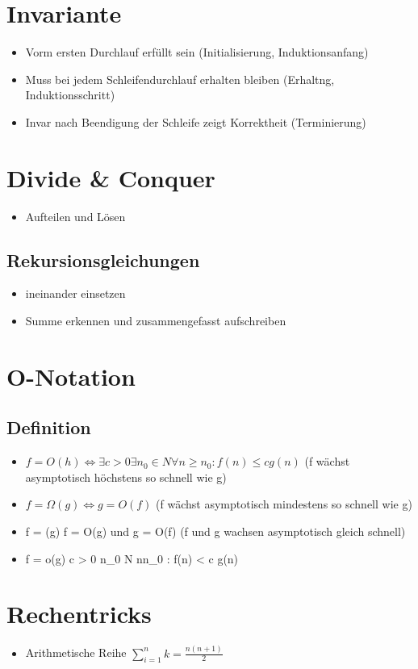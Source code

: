 \documentclass{article}
\begin{document}
\section{Invariante}
\begin{itemize}
\item Vorm ersten Durchlauf erfüllt sein (Initialisierung, Induktionsanfang)
\item Muss bei jedem Schleifendurchlauf erhalten bleiben (Erhaltng, Induktionsschritt)
\item Invar nach Beendigung der Schleife zeigt Korrektheit (Terminierung)
\end{itemize}

\section{Divide \& Conquer}
\begin{itemize}
\item Aufteilen und Lösen
\end{itemize}


\subsection{Rekursionsgleichungen}
\begin{itemize}
\item ineinander einsetzen
\item Summe erkennen und zusammengefasst aufschreiben
\end{itemize}

\section{ O-Notation}
\subsection{Definition}
\begin{itemize}
\item $f = O(h) \Leftrightarrow  \exists  c> 0 \exists n_0 \in N \forall n \geq n_0 : f(n) \leq c g(n)$ \newline (f wächst asymptotisch höchstens so schnell wie g)
\item $f = \Omega(g) \Leftrightarrow g = O(f)$ \newline (f wächst asymptotisch mindestens so schnell wie g)

\item f = \Theta(g) \Leftrightarrow f = O(g) und g = O(f) \newline
(f und g wachsen asymptotisch gleich schnell)
\item f = o(g) \Leftrightarrow \forall c > 0 \exists n_0 \in N \forall n\beq n_0 : f(n) < c g(n)
\end{itemize}



\section{Rechentricks}
\begin{itemize}
\item Arithmetische Reihe $\sum_{i=1}^n k  = \frac{n(n+1)}{2} $
\end{itemize}
\end{document}
